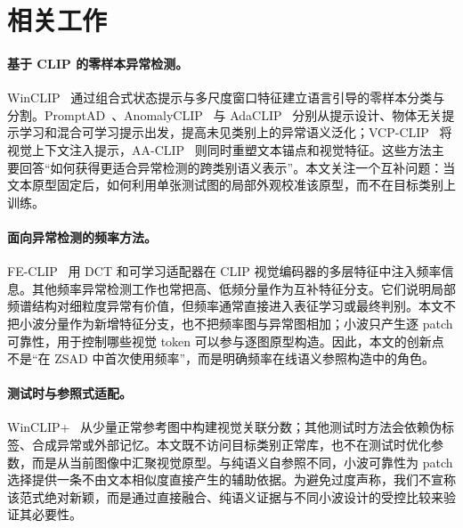 \section{相关工作}
\label{sec:related}

\paragraph{基于 CLIP 的零样本异常检测。}
WinCLIP~\cite{jeong2023winclip} 通过组合式状态提示与多尺度窗口特征建立语言引导的零样本分类与分割。PromptAD~\cite{li2024promptad}、AnomalyCLIP~\cite{zhou2024anomalyclip} 与 AdaCLIP~\cite{cao2024adaclip} 分别从提示设计、物体无关提示学习和混合可学习提示出发，提高未见类别上的异常语义泛化；VCP-CLIP~\cite{qu2024vcpclip} 将视觉上下文注入提示，AA-CLIP~\cite{ma2025aaclip} 则同时重塑文本锚点和视觉特征。这些方法主要回答“如何获得更适合异常检测的跨类别语义表示”。本文关注一个互补问题：当文本原型固定后，如何利用单张测试图的局部外观校准该原型，而不在目标类别上训练。

\paragraph{面向异常检测的频率方法。}
FE-CLIP~\cite{gong2025feclip} 用 DCT 和可学习适配器在 CLIP 视觉编码器的多层特征中注入频率信息。其他频率异常检测工作也常把高、低频分量作为互补特征分支。它们说明局部频谱结构对细粒度异常有价值，但频率通常直接进入表征学习或最终判别。本文不把小波分量作为新增特征分支，也不把频率图与异常图相加；小波只产生逐 patch 可靠性，用于控制哪些视觉 token 可以参与逐图原型构造。因此，本文的创新点不是“在 ZSAD 中首次使用频率”，而是明确频率在线语义参照构造中的角色。

\paragraph{测试时与参照式适配。}
WinCLIP+~\cite{jeong2023winclip} 从少量正常参考图中构建视觉关联分数；其他测试时方法会依赖伪标签、合成异常或外部记忆。本文既不访问目标类别正常库，也不在测试时优化参数，而是从当前图像中汇聚视觉原型。与纯语义自参照不同，小波可靠性为 patch 选择提供一条不由文本相似度直接产生的辅助依据。为避免过度声称，我们不宣称该范式绝对新颖，而是通过直接融合、纯语义证据与不同小波设计的受控比较来验证其必要性。
